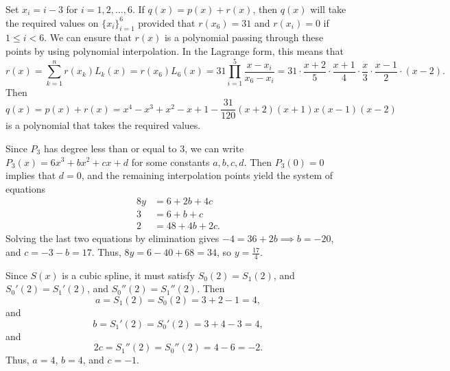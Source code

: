 \documentclass{homework}
\begin{document}
	\maketitle
	
	\question Set $x_i = i-3$ for $i=1,2,\dots, 6$. If $q(x) = p(x) + r(x)$, then $q(x)$ will take the required values on $\{x_i\}_{i=1}^6$ provided that $r(x_6) = 31$ and $r(x_i) = 0$ if $1\le i <6$. We can ensure that $r(x)$ is a polynomial passing through these points by using polynomial interpolation. In the Lagrange form, this means that
	\begin{equation*}
		r(x) = \sum_{k=1}^n r(x_k)L_k(x)= r(x_6)L_6(x) = 31\prod_{i=1}^5\frac{x-x_i}{x_6 - x_i} = 31\cdot\frac{x+2}{5}\cdot\frac{x+1}{4}\cdot\frac{x}{3}\cdot\frac{x-1}{2}\cdot(x-2).
	\end{equation*}
	Then
	\begin{equation*}
		q(x) = p(x) + r(x) = x^4 - x^3 + x^2 -x+ 1 - \frac{31}{120}(x+2)(x+1)x(x-1)(x-2)
	\end{equation*}
	is a polynomial that takes the required values.
	
	\question Since $P_3$ has degree less than or equal to 3, we can write $P_3(x) = 6x^3 + bx^2 + cx + d$ for some constants $a,b,c,d$. Then $P_3(0) = 0$ implies that $d = 0$, and the remaining interpolation points yield the system of equations
	\begin{align*}
		8y &= 6 + 2b + 4c \\
		3 &= 6 + b + c \\
		2 &= 48 + 4b + 2c.
	\end{align*}
	Solving the last two equations by elimination gives $-4 = 36 + 2b \implies b = -20$, and $c = -3 -b = 17$. Thus, $8y =  6 -40 + 68 = 34$, so $y = \frac{17}{4}$.
	
	\question Since $S(x)$ is a cubic spline, it must satisfy $S_0(2) = S_1(2)$, and $S_0'(2) = S_1'(2)$, and $S_0''(2) = S_1''(2)$. Then
	\begin{equation*}
		a = S_1(2) = S_0(2) = 3 + 2 - 1 = 4,
	\end{equation*}
	and
	\begin{equation*}
		b = S_1'(2) = S_0'(2) = 3 + 4 - 3 = 4,
	\end{equation*}
	and
	\begin{equation*}
		2c = S_1''(2) = S_0''(2) = 4 - 6 = -2.
	\end{equation*}
	Thus, $a= 4$, $b=4$, and $c= -1$.
	
\end{document}
